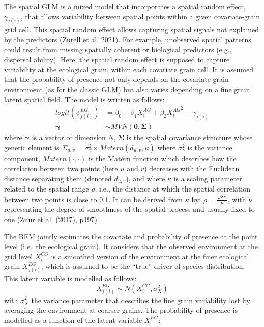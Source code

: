 \documentclass[
  12pt,
  a4paper]{article}
\begin{document}
The spatial GLM is a mixed model that incorporates a spatial random effect, \(\gamma_{j(i)}\), that allows variability between spatial points within a given covariate-grain grid cell. This spatial random effect allows capturing spatial signals not explained by the predictors (Zurell et al. 2021). For example, unobserved spatial patterns could result from missing spatially coherent or biological predictors (e.g., dispersal ability). Here, the spatial random effect is supposed to capture variability at the ecological grain, within each covariate grain cell. It is assumed that the probability of presence not only depends on the covariate grain environment (as for the classic GLM) but also varies depending on a fine grain latent spatial field. The model is written as follows:
\begin{align*}
logit(\psi^{EG}_{j(i)}) &= \beta_0 + \beta_1 X^{AG}_i + \beta_2 {X^{AG}_i}^2 + \gamma_{j(i)} \\
\boldsymbol{\gamma} &\sim MVN(\boldsymbol{0}, \boldsymbol{\Sigma})
\end{align*}
where \(\boldsymbol{\gamma}\) is a vector of dimension \(N\), \(\boldsymbol{\Sigma}\) is the spatial covariance structure whose generic element is \(\Sigma_{u,v} = \sigma_\gamma^2 \times Matern(d_{u,v}, \kappa)\) where \(\sigma_\gamma^2\) is the variance component, \(Matern(\cdot,\cdot)\) is the Matérn function which describes how the correlation between two points (here \(u\) and \(v\)) decreases with the Euclidean distance separating them (denoted \(d_{u,v}\)), and where \(\kappa\) is a scaling parameter related to the spatial range \(\rho\), i.e., the distance at which the spatial correlation between two points is close to 0.1. It can be derived from \(\kappa\) by: \(\rho = \frac{\sqrt{8\nu}}{\kappa}\), with \(\nu\) representing the degree of smoothness of the spatial process and usually fixed to one (Zuur et al. (2017), p197).

The BEM jointly estimates the covariate and probability of presence at the point level (i.e.~the ecological grain). It considers that the observed environment at the grid level \(X^{CG}_i\) is a smoothed version of the environment at the finer ecological grain \(X^{EG}_{j(i)}\), which is assumed to be the ``true'' driver of species distribution. This latent variable is modelled as follows:
\[X^{EG}_{j(i)} \sim N(X^{CG}_i, \sigma_X^2)\]
with \(\sigma_X^2\) the variance parameter that describes the fine grain variability lost by averaging the environment at coarser grains. The probability of presence is modelled as a function of the latent variable \(X^{EG}\):
\end{document}
